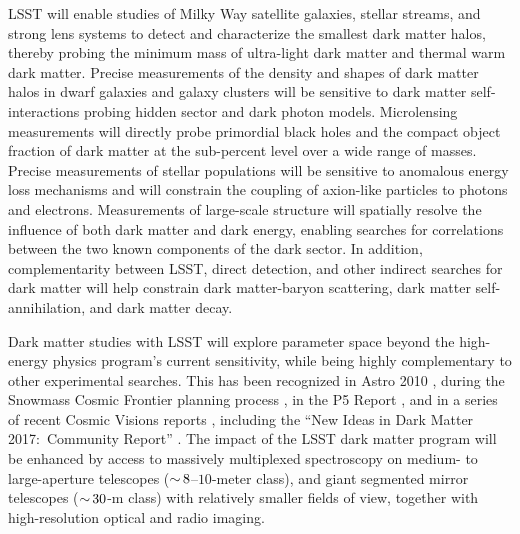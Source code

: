 \documentclass[12pt]{article}
\begin{document}
LSST will enable studies of Milky Way satellite galaxies, stellar streams, and strong lens systems to detect and characterize the smallest dark matter halos, thereby probing the minimum mass of ultra-light dark matter and thermal warm dark matter.
Precise measurements of the density and shapes of dark matter halos in dwarf galaxies and galaxy clusters will be sensitive to dark matter self-interactions probing hidden sector and dark photon models.
Microlensing measurements will directly probe primordial black holes and the compact object fraction of dark matter at the sub-percent level over a wide range of masses.
Precise measurements of stellar populations will be sensitive to anomalous energy loss mechanisms and will constrain the coupling of axion-like particles to photons and electrons.
Measurements of large-scale structure will spatially resolve the influence of both dark matter and dark energy, enabling searches for correlations between the two known components of the dark sector.
In addition, complementarity between LSST, direct detection, and other indirect searches for dark matter will help constrain dark matter-baryon scattering, dark matter self-annihilation, and dark matter decay. 

Dark matter studies with LSST will explore parameter space beyond the high-energy physics program's current sensitivity, while being highly complementary to other experimental searches.
This has been recognized in Astro 2010 \citep{Astro2010}, during the Snowmass Cosmic Frontier planning process \citep[][]{1310.8642, 1310.5662, 1305.1605}, in the P5 Report \citep[]{P5Report}, and in a series of recent Cosmic Visions reports \citep[][]{1604.07626,1802.07216}, including the ``New Ideas in Dark Matter 2017:\ Community Report'' \citep{Battaglieri:2017aum}.
The impact of the LSST dark matter program will be enhanced by access to massively multiplexed spectroscopy on medium- to large-aperture telescopes ($ {\sim}\, 8$--$10$-meter class), and giant segmented mirror telescopes ($ {\sim}\, 30$-m class) with relatively smaller fields of view, together with high-resolution optical and radio imaging.
\end{document}
